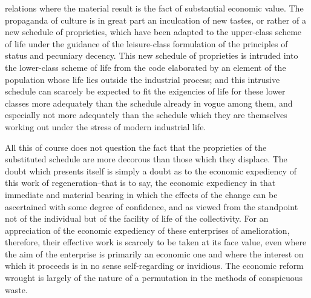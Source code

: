 \documentclass[12pt]{report}
\begin{document}
relations where the material result is the fact of substantial economic
value. The propaganda of culture is in great part an inculcation of
new tastes, or rather of a new schedule of proprieties, which have been
adapted to the upper-class scheme of life under the guidance of the
leisure-class formulation of the principles of status and pecuniary
decency. This new schedule of proprieties is intruded into the
lower-class scheme of life from the code elaborated by an element of
the population whose life lies outside the industrial process; and this
intrusive schedule can scarcely be expected to fit the exigencies of
life for these lower classes more adequately than the schedule already
in vogue among them, and especially not more adequately than the
schedule which they are themselves working out under the stress of
modern industrial life.

All this of course does not question the fact that the proprieties
of the substituted schedule are more decorous than those which they
displace. The doubt which presents itself is simply a doubt as to the
economic expediency of this work of regeneration--that is to say, the
economic expediency in that immediate and material bearing in which the
effects of the change can be ascertained with some degree of confidence,
and as viewed from the standpoint not of the individual but of the
facility of life of the collectivity. For an appreciation of the
economic expediency of these enterprises of amelioration, therefore,
their effective work is scarcely to be taken at its face value, even
where the aim of the enterprise is primarily an economic one and where
the interest on which it proceeds is in no sense self-regarding or
invidious. The economic reform wrought is largely of the nature of a
permutation in the methods of conspicuous waste.
\end{document}
